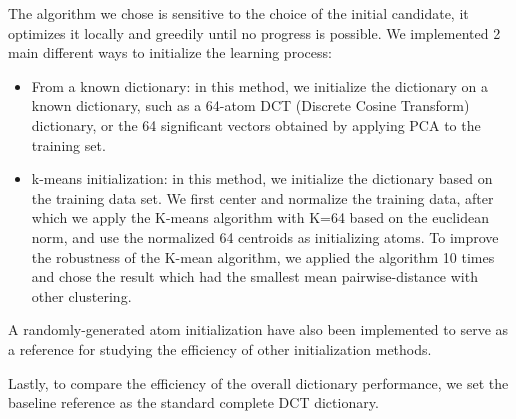 The algorithm we chose is sensitive to the choice of the initial candidate, it optimizes it locally and greedily until no progress is possible. We implemented 2 main different ways to initialize the learning process:
\begin{itemize}
   \item From a known dictionary: in this method, we initialize the dictionary on a known dictionary, such as a 64-atom DCT (Discrete Cosine Transform) dictionary, or the 64 significant vectors obtained by applying PCA to the training set.  
   \item k-means initialization: in this method, we initialize the dictionary based on the training data set. We first center and normalize the training data, after which we apply the K-means algorithm with K=64 based on the euclidean norm, and use the normalized 64 centroids as initializing atoms. To improve the robustness of the K-mean algorithm, we applied the algorithm 10 times and chose the result which had the smallest mean pairwise-distance with other clustering. 
\end{itemize}
A randomly-generated atom initialization have also been implemented to serve as a reference for studying the efficiency of other initialization methods. 

Lastly, to compare the efficiency of the overall dictionary performance, we set the baseline reference as the standard complete DCT dictionary.
